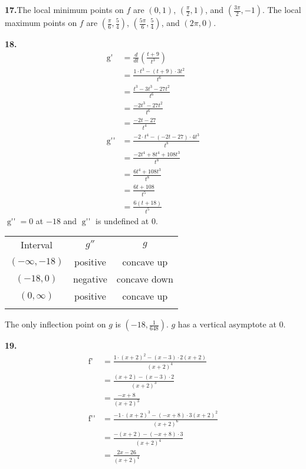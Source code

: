\documentclass[12pt,]{book}
\theoremstyle{plain}
\theoremstyle{definition}
\numberwithin{equation}{section}
\newcommand{\hrulethin}  {\noalign{\hrule height 0.04em}}
\newcommand{\hrulemedium}{\noalign{\hrule height 0.07em}}
\newcommand{\hrulethick} {\noalign{\hrule height 0.11em}}
\newcommand{\fe}[2]{\mathop{{#1}{\left(#2\right)}}}
\newcommand{\ointerval}[2]{\left(#1,#2\right)}
\newcommand{\point}[2]{\left(#1,#2\right)}
\newcommand{\fd}[1]{#1'}
\newcommand{\sd}[1]{#1''}
\newcommand{\lzoo}[2]{{\frac{d}{d#1}}{\left(#2\right)}}
\begin{document}
\begin{multicols}{2}
{\par\smallskip
\noindent\textbf{17.}\quad{}The local minimum points on \(f\) are \(\point{0}{1}\), \(\point{\frac{\pi}{2}}{1}\), and \(\point{\frac{3\pi}{2}}{-1}\).  The local maximum points on \(f\) are \(\point{\frac{\pi}{6}}{\frac{5}{4}}\), \(\point{\frac{5\pi}{6}}{\frac{5}{4}}\), and \(\point{2\pi}{0}\).%
\par\smallskip
\noindent\textbf{18.}\quad{}\begin{align*}
\fe{\fd{g}}{t}&=\lzoo{t}{\frac{t+9}{t^3}}\\
&=\frac{1\cdot t^3-(t+9)\cdot3t^2}{t^6}\\
&=\frac{t^3-3t^3-27t^2}{t^6}\\
&=\frac{-2t^3-27t^2}{t^6}\\
&=\frac{-2t-27}{t^4}\\
\fe{\sd{g}}{t}&=\frac{-2\cdot t^4-(-2t-27)\cdot4t^3}{t^8}\\
&=\frac{-2t^4+8t^4+108t^3}{t^8}\\
&=\frac{6t^4+108t^3}{t^8}\\
&=\frac{6t+108}{t^5}\\
&=\frac{6(t+18)}{t^5}
\end{align*}\(\fe{\sd{g}}{t}=0\) at \(-18\) and \(\fe{\sd{g}}{t}\) is undefined at \(0\).%
\begin{tabular}{ccc}\hrulethick
Interval&\(\sd{g}\)&\(g\)\\\hrulemedium
\(\ointerval{-\infty}{-18}\)&positive&concave up\\\hrulethin
\(\ointerval{-18}{0}\)&negative&concave down\\\hrulethin
\(\ointerval{0}{\infty}\)&positive&concave up\\\hrulethick
\end{tabular}
\par
The only inflection point on \(g\) is \(\point{-18}{\frac{1}{648}}\). \(g\) has a vertical asymptote at \(0\).%
\par\smallskip
\noindent\textbf{19.}\quad{}\begin{align*}
\fe{\fd{f}}{x}&=\frac{1\cdot(x+2)^2-(x-3)\cdot2(x+2)}{(x+2)^4}\\
&=\frac{(x+2)-(x-3)\cdot2}{(x+2)^3}\\
&=\frac{-x+8}{(x+2)^3}\\
\fe{\sd{f}}{x}&=\frac{-1\cdot(x+2)^3-(-x+8)\cdot3(x+2)^2}{(x+2)^6}\\
&=\frac{-(x+2)-(-x+8)\cdot3}{(x+2)^4}\\
&=\frac{2x-26}{(x+2)^4}\\

\end{align*}}
\end{multicols}
\end{document}
